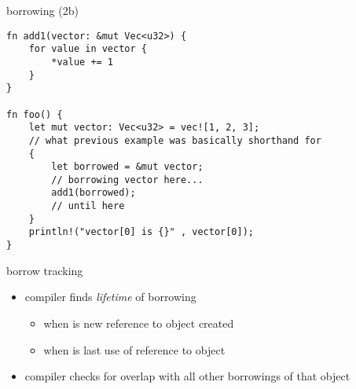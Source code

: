 \begin{frame}[fragile,label=rustBorrowing2]{borrowing (2b)}
\begin{verbatim}
fn add1(vector: &mut Vec<u32>) {
    for value in vector {
        *value += 1
    }
}

fn foo() {
    let mut vector: Vec<u32> = vec![1, 2, 3];
    // what previous example was basically shorthand for
    {
        let borrowed = &mut vector;
        // borrowing vector here...
        add1(borrowed);
        // until here
    }
    println!("vector[0] is {}" , vector[0]);
}
\end{verbatim}
\end{frame}


\begin{frame}{borrow tracking}
    \begin{itemize}
    \item compiler finds \textit{lifetime} of borrowing
        \begin{itemize}
        \item when is new reference to object created
        \item when is last use of reference to object
        \end{itemize}
    \item compiler checks for overlap with all other borrowings of that object
    \end{itemize}
\end{frame}

